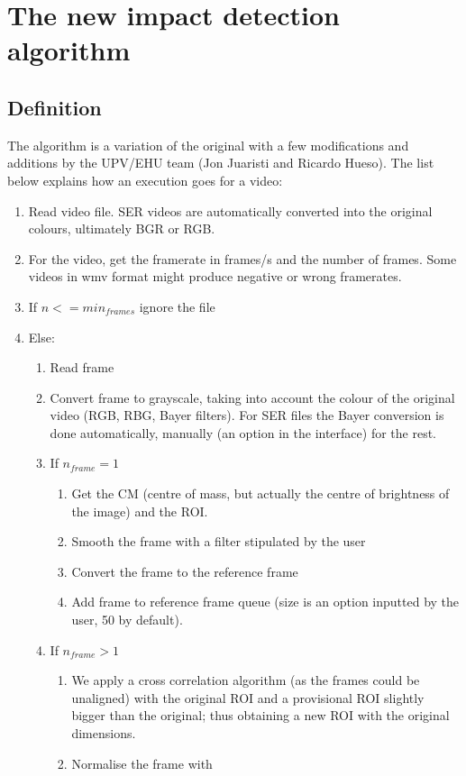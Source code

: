 \documentclass[a4paper,11pt]{memoir}
\begin{document}
\section{The new impact detection algorithm}

\subsection{Definition}
The algorithm is a variation of the original with a few modifications and additions by the UPV/EHU team (Jon Juaristi and Ricardo Hueso). The list below explains how an execution goes for a video:
\begin{enumerate}
\item Read video file. SER videos are automatically converted into the original colours, ultimately BGR or RGB.
\item For the video, get the framerate in frames/s and the number of frames.
Some videos in wmv format might produce negative or wrong framerates.
\item  If $n <= min_{frames}$ ignore the file
\item  Else:
\begin{enumerate}
\item Read frame
\item  Convert frame to grayscale, taking into account the colour of the original video (RGB, RBG, Bayer filters). For SER files the Bayer conversion is done
automatically, manually (an option in the interface) for the rest.
\item If $n_{frame} = 1$
\begin{enumerate}
\item Get the CM (centre of mass, but actually the centre of brightness of
the image) and the ROI.
\item Smooth the frame with a filter stipulated by the user
\item Convert the frame to the reference frame
\item Add frame to reference frame queue (size is an option inputted by the user, 50 by default).
\end{enumerate}
\item If $n_{frame} > 1$
\begin{enumerate}
\item We apply a cross correlation algorithm (as the frames could be
unaligned) with the original ROI and a provisional ROI slightly bigger
than the original; thus obtaining a new ROI with the original
dimensions.
\item Normalise the frame with

\end{enumerate}
\end{enumerate}
\end{enumerate}
\end{document}

